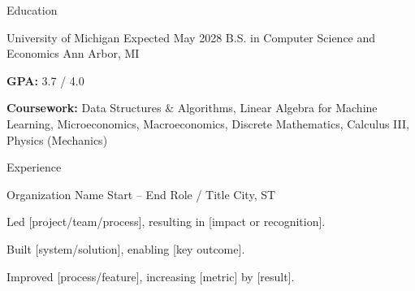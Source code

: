 \documentclass[
	11pt
]{template}
\begin{document}
	\begin{rSection}{E}{ducation}
		\begin{rSectionEntry}
			{University of Michigan}
			{Expected May 2028}
			{B.S. in Computer Science and Economics}
			{}
			{Ann Arbor, MI}

			\item \textbf{GPA:} 3.7 / 4.0
			\item \textbf{Coursework:} Data Structures \& Algorithms, Linear Algebra for Machine Learning, Microeconomics, Macroeconomics, Discrete Mathematics, Calculus III, Physics (Mechanics)
		\end{rSectionEntry}
	\end{rSection}

	\begin{rSection}{E}{xperience}
		\begin{rSectionEntry}
			{Organization Name}
			{Start -- End}
			{Role / Title}
			{}
			{City, ST}

			\item Led [project/team/process], resulting in [impact or recognition].
			\item Built [system/solution], enabling [key outcome].
			\item Improved [process/feature], increasing [metric] by [result].
		\end{rSectionEntry}

	\end{rSection}
\end{document}
